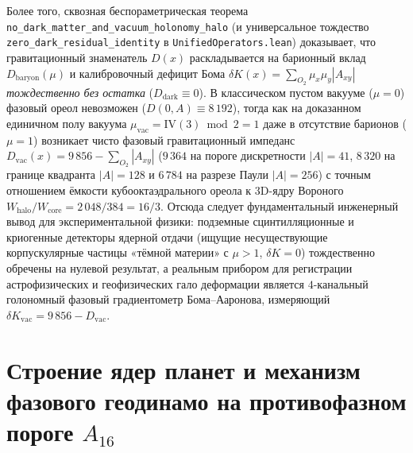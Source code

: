 Более того, сквозная беспораметрическая теорема \texttt{no\_\allowbreak dark\_\allowbreak matter\_\allowbreak and\_\allowbreak vacuum\_\allowbreak holonomy\_\allowbreak halo} (и универсальное тождество \texttt{zero\_\allowbreak dark\_\allowbreak residual\_\allowbreak identity} в \texttt{UnifiedOperators.lean}) доказывает, что гравитационный знаменатель $D(x)$ раскладывается на барионный вклад $D_{\mathrm{baryon}}(\mu)$ и калибровочный дефицит Бома $\delta K(x) = \sum_{O_2}\mu_x\mu_y|A_{xy}|$ \emph{тождественно без остатка} ($D_{\mathrm{dark}}\equiv 0$). В классическом пустом вакууме ($\mu=0$) фазовый ореол невозможен ($D(0,A)\equiv 8\,192$), тогда как на доказанном единичном полу вакуума $\mu_{\mathrm{vac}} = \mathrm{IV}(3)\bmod 2 = 1$ даже в отсутствие барионов ($\mu=1$) возникает чисто фазовый гравитационный импеданс $D_{\mathrm{vac}}(x) = 9\,856 - \sum_{O_2}|A_{xy}|$ ($9\,364$ на пороге дискретности $|A|=41$, $8\,320$ на границе квадранта $|A|=128$ и $6\,784$ на разрезе Паули $|A|=256$) с точным отношением ёмкости кубооктаэдрального ореола к $3\mathrm{D}$-ядру Вороного $W_{\mathrm{halo}}/W_{\mathrm{core}} = 2\,048/384 = 16/3$. Отсюда следует фундаментальный инженерный вывод для экспериментальной физики: подземные сцинтилляционные и криогенные детекторы ядерной отдачи (ищущие несуществующие корпускулярные частицы «тёмной материи» с $\mu>1$, $\delta K=0$) тождественно обречены на нулевой результат, а реальным прибором для регистрации астрофизических и геофизических гало деформации является $4$-канальный голономный фазовый градиентометр Бома--Ааронова, измеряющий $\delta K_{\mathrm{vac}} = 9\,856 - D_{\mathrm{vac}}$.

\section{Строение ядер планет и механизм фазового геодинамо на противофазном пороге \texorpdfstring{$A_{16}$}{A16}}
\label{sec:applied-planetary-cores}

